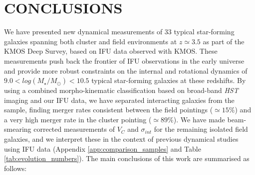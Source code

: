 \documentclass[fleqn,usenatbib]{mnras}
\begin{document}
\section{CONCLUSIONS}\label{sec:conclusion}
We have presented new dynamical measurements of 33 typical star-forming galaxies spanning both cluster and field environments at $z\simeq3.5$ as part of the KMOS Deep Survey, based on IFU data observed with KMOS.
These measurements push back the frontier of IFU observations in the early universe and provide more robust constraints on the internal and rotational dynamics of $9.0 < log(M_{\star}/M_{\odot})< 10.5$ typical star-forming galaxies at these redshifts.
By using a combined morpho-kinematic classification based on broad-band {\em HST} imaging and our IFU data, we have separated interacting galaxies from the sample, finding merger rates consistent between the field pointings ($\simeq15\%$) and a very high merger rate in the cluster pointing ($\simeq89\%$).
We have made beam-smearing corrected measurements of $V_{C}$ and $\sigma_{int}$ for the remaining isolated field galaxies, and we interpret these in the context of previous dynamical studies using IFU data (Appendix \ref{app:comparison_samples} and Table \ref{tab:evolution_numbers}).
The main conclusions of this work are summarised as follows:
\end{document}
